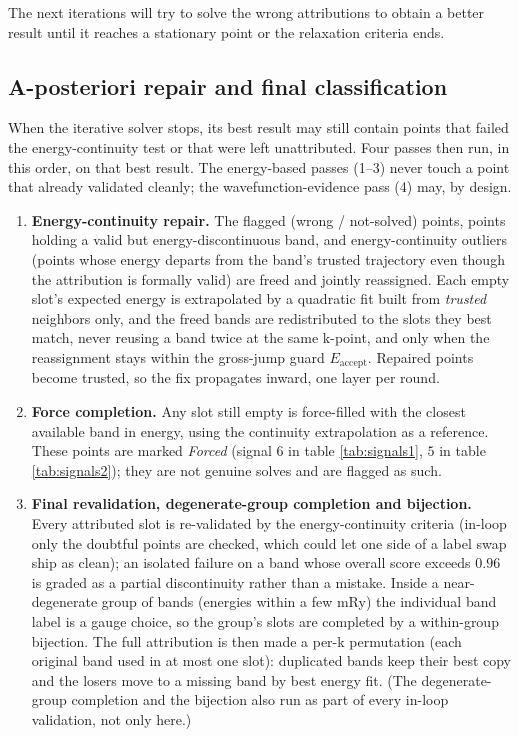 \documentclass[a4paper,12pt]{report}
\begin{document}
\begin{appendices}
The next iterations will try to solve the wrong attributions to obtain a better result until it reaches a stationary point or the relaxation criteria ends.


\subsection{A-posteriori repair and final classification}

When the iterative solver stops, its best result may still contain points that failed the energy-continuity test or that were left unattributed. Four passes then run, in this order, on that best result. The energy-based passes (1--3) never touch a point that already validated cleanly; the wavefunction-evidence pass (4) may, by design.

\begin{enumerate}
    \item \textbf{Energy-continuity repair.} The flagged (wrong / not-solved) points, points holding a valid but energy-discontinuous band, and energy-continuity outliers (points whose energy departs from the band's trusted trajectory even though the attribution is formally valid) are freed and jointly reassigned. Each empty slot's expected energy is extrapolated by a quadratic fit built from \emph{trusted} neighbors only, and the freed bands are redistributed to the slots they best match, never reusing a band twice at the same k-point, and only when the reassignment stays within the gross-jump guard $E_\text{accept}$. Repaired points become trusted, so the fix propagates inward, one layer per round.
    \item \textbf{Force completion.} Any slot still empty is force-filled with the closest available band in energy, using the continuity extrapolation as a reference. These points are marked \emph{Forced} (signal $6$ in table \ref{tab:signals1}, $5$ in table \ref{tab:signals2}); they are not genuine solves and are flagged as such.
    \item \textbf{Final revalidation, degenerate-group completion and bijection.} Every attributed slot is re-validated by the energy-continuity criteria (in-loop only the doubtful points are checked, which could let one side of a label swap ship as clean); an isolated failure on a band whose overall score exceeds $0.96$ is graded as a partial discontinuity rather than a mistake. Inside a near-degenerate group of bands (energies within a few mRy) the individual band label is a gauge choice, so the group's slots are completed by a within-group bijection. The full attribution is then made a per-k permutation (each original band used in at most one slot): duplicated bands keep their best copy and the losers move to a missing band by best energy fit. (The degenerate-group completion and the bijection also run as part of every in-loop validation, not only here.)

\end{enumerate}
\end{appendices}
\end{document}
